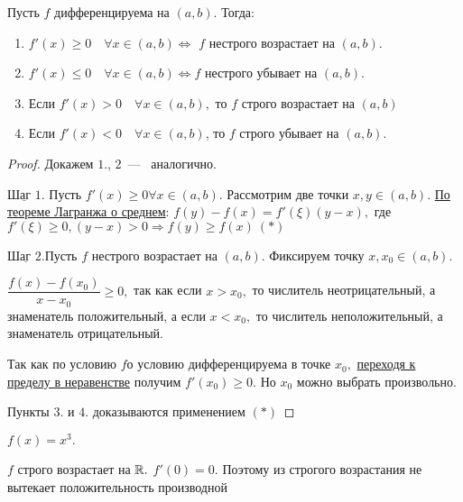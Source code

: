 \begin{theorem}
	Пусть $f$ дифференцируема на $(a, b).$ Тогда:
	\begin{enumerate}
		\item $f'(x) \geq 0 \quad \forall x\in (a, b) \Leftrightarrow$ $f$ нестрого возрастает на $(a, b)$.
		\item $f'(x) \leq 0 \quad \forall x\in (a, b) \Leftrightarrow$$f$ нестрого убывает на $(a, b)$.
		\item Если $f'(x) > 0 \quad \forall x\in (a, b),$ то $f$ строго возрастает на $(a, b)$
		\item Если $f'(x) < 0 \quad \forall x\in (a, b)$, то $f$ строго убывает на $(a, b)$.
	\end{enumerate}
\end{theorem}
\begin{proof}
	Докажем $1.$, $2$~---~ аналогично.
	
	$\underline{\textrm{Шаг 1}}$. Пусть $f'(x) \geq 0 \forall x\in (a, b).$ Рассмотрим две точки $x, y \in (a, b).$  \hyperlink{thrm5.11cor}{По теореме Лагранжа о среднем}: $f(y) - f(x) = f'(\xi)(y-x),$ где $f'(\xi) \geq 0, (y-x) > 0 \Rightarrow f(y) \geq f(x) \ (*)$
	
	$\underline{\textrm{Шаг 2.}}$Пусть $f$ нестрого возрастает на $(a, b)$. Фиксируем точку $x, x_{0} \in (a, b).$ 
	
	$\dfrac{f(x)-f(x_{0})}{x-x_{0}} \geq 0,$ так как если $x > x_{0},$ то числитель неотрицательный, а знаменатель положительный, а если $x < x_{0},$ то числитель неположительный, а знаменатель отрицательный.
	
	Так как по условию $f$о условию дифференцируема в точке $x_{0},$ \hyperlink{thrm4.8}{переходя к пределу в неравенстве} получим $f'(x_{0}) \geq 0$. Но $x_{0}$ можно выбрать произвольно.
	
	Пункты $3.$ и $4.$ доказываются применением $(*)$
\end{proof}
\begin{example}
	$f(x) = x^{3}.$
	
	$f$ строго возрастает на $\mathbb{R}.$ $f'(0) = 0.$ Поэтому из строгого возрастания не вытекает положительность производной
\end{example}



